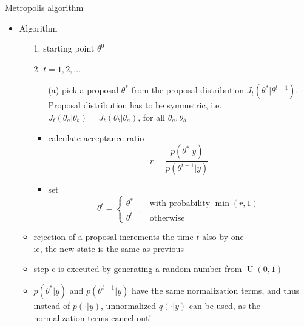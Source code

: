 \documentclass[finnish,english,t]{beamer}
\DeclareMathOperator{\U}{U}
\begin{document}
\begin{frame}{Metropolis algorithm}

  \begin{itemize}
  \item Algorithm
    \begin{itemize}
      \item[1.] starting point $\theta^0$
      \item[2.] $t=1,2,\ldots$
        \begin{itemize}
        \item[(a)] pick a proposal $\theta^{*}$ from the proposal distribution
          $J_t(\theta^{*}|\theta^{t-1})$. \\
          Proposal distribution has to be symmetric, i.e.\\
          $J_t(\theta_a|\theta_b)=J_t(\theta_b|\theta_a)$, for all
          $\theta_a,\theta_b$
        \item<2->[(b)] calculate acceptance ratio
          \begin{equation*}
            r=\frac{p(\theta^{*}|y)}{p(\theta^{t-1}|y)}
          \end{equation*}
          \vspace{-6mm}
        \item<3->[(c)] set
          \begin{equation*}
            \theta^t=
            \begin{cases}
              \theta^{*} & \text{with probability $\min(r,1)$}\\
              \theta^{t-1} & \text{otherwise}
            \end{cases}
          \end{equation*}
      \end{itemize}
      \vspace{-1.5\baselineskip}
    \item<5-> rejection of a proposal increments the time $t$ also by one\\
      ie, the new state is the same as previous
      \item<6-> step c is executed by generating a random number from 
        $\U(0,1)$
      \item<7-> $p(\theta^*|y)$ and $p(\theta^{t-1}|y)$ have the same
        normalization terms, and thus instead of $p(\cdot|y)$,
        unnormalized $q(\cdot|y)$ can be used, as the normalization
        terms cancel out!
    \end{itemize}
  \end{itemize}

\end{frame}
\end{document}
